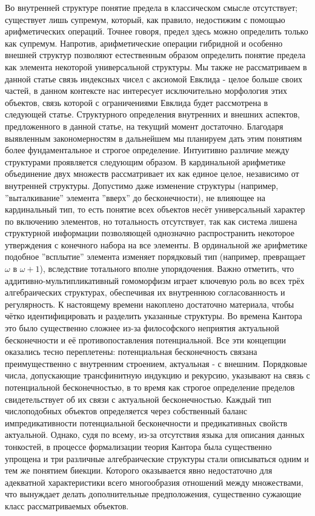 \documentclass[12pt]{article}
\begin{document}
Во внутренней структуре понятие предела в классическом смысле отсутствует; существует лишь супремум, который, как правило, недостижим с помощью арифметических операций. Точнее говоря, предел здесь можно определить только как супремум. Напротив, арифметические операции гибридной и особенно внешней структур позволяют естественным образом определить понятие предела как элемента некоторой универсальной структуры. Мы также не рассматриваем в данной статье связь индексных чисел с аксиомой Евклида - целое больше своих частей, в данном контексте нас интересует исключительно морфология этих объектов, связь которой с ограничениями Евклида будет рассмотрена в следующей статье. Структурного определения внутренних и внешних аспектов, предложенного в данной статье, на текущий момент достаточно. Благодаря выявленным закономерностям в дальнейшем мы планируем дать этим понятиям более фундаментальное и строгое определение. Интуитивно различие между структурами проявляется следующим образом. В кардинальной арифметике объединение двух множеств рассматривает их как единое целое, независимо от внутренней структуры. Допустимо даже изменение структуры (например, ''выталкивание'' элемента ''вверх'' до бесконечности), не влияющее на кардинальный тип, то есть понятие всех объектов несёт универсальный характер по включению элементов, но тотальность отсутствует, так как система лишена структурной информации позволяющей однозначно распространить некоторое утверждения с конечного набора на все элементы. В ординальной же арифметике подобное ''всплытие'' элемента изменяет порядковый тип (например, превращает $\omega$ в $\omega + 1$), вследствие тотального вполне упорядочения. Важно отметить, что аддитивно-мультипликативный гомоморфизм играет ключевую роль во всех трёх алгебраических структурах, обеспечивая их внутреннюю согласованность и регулярность. К настоящему времени накоплено достаточно материала, чтобы чётко идентифицировать и разделить указанные структуры. Во времена Кантора это было существенно сложнее из-за философского неприятия актуальной бесконечности и её противопоставления потенциальной. Все эти концепции оказались тесно переплетены: потенциальная бесконечность связана преимущественно с внутренним строением, актуальная - с внешним. Порядковые числа, допускающие трансфинитную индукцию и рекурсию, указывают на связь с потенциальной бесконечностью, в то время как строгое определение пределов свидетельствует об их связи с актуальной бесконечностью. Каждый тип числоподобных объектов определяется через собственный баланс импредикативности потенциальной бесконечности и предикативных свойств актуальной. Однако, судя по всему, из-за отсутствия языка для описания данных тонкостей, в процессе формализации теория Кантора была существенно упрощена и три различные алгебраические структуры стали описываться одним и тем же понятием биекции. Которого оказывается явно недостаточно для адекватной характеристики всего многообразия отношений между множествами, что вынуждает делать дополнительные предположения, существенно сужающие класс рассматриваемых объектов.
\end{document}
